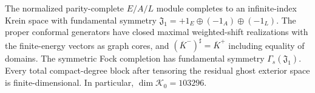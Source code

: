 \begin{theorem}
The normalized parity-complete $E/A/L$ module completes to an
infinite-index Krein space with fundamental symmetry
$\mathfrak J_1=+1_E\oplus(-1_A)\oplus(-1_L)$.
The proper conformal generators have closed maximal weighted-shift
realizations with the finite-energy vectors as graph cores, and
$(\overline K^-)^\sharp=\overline K^+$ including equality of domains.
The symmetric Fock completion has fundamental symmetry
$\Gamma_s(\mathfrak J_1)$.  Every total compact-degree block after
tensoring the residual ghost exterior space is finite-dimensional.
In particular, $\dim\mathscr K_0=103296$.
\end{theorem}
